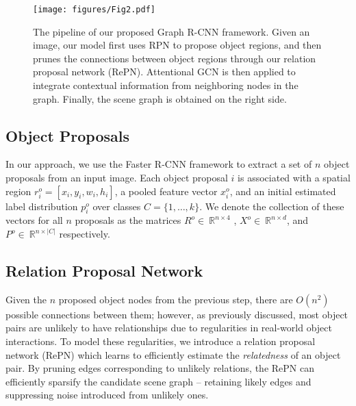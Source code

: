 \begin{figure}[t]
\centering
\texttt{[image: figures/Fig2.pdf]}
\caption{The pipeline of our proposed Graph R-CNN framework. Given an image, our model first uses RPN to propose object regions, and then prunes the connections between object regions through our relation proposal network (RePN). Attentional GCN is then applied to integrate contextual information from neighboring nodes in the graph. Finally, the scene graph is obtained on the right side.}
\label{fig:framework}
\end{figure}

\subsection{Object Proposals}
\label{sec:rpn}
In our approach, we use the Faster R-CNN \cite{ren2015faster} framework to extract a set of $n$ object proposals from an input image. Each object proposal $i$ is associated with a spatial region $r^o_i =[x_i,y_i,w_i,h_i]$, a pooled feature vector $x^o_i$, and an initial estimated label distribution $p^o_i$ over classes $C{=}\{1,\dots,k\}$. We denote the collection of these vectors for all $n$ proposals as the matrices $R^o {\in}~\mathbb{R}^{n \times 4}$ , $X^o {\in}~ \mathbb{R}^{n \times d}$, and $P^o{\in}~\mathbb{R}^{n \times |C|}$ respectively.

\subsection{Relation Proposal Network}
\label{sec:repn}

Given the $n$ proposed object nodes from the previous step, there are $O(n^2)$ possible connections between them; however, as previously discussed, most object pairs are unlikely to have relationships due to regularities in real-world object interactions. To model these regularities, we introduce a relation proposal network (RePN) which learns to  efficiently estimate the \emph{relatedness} of an object pair.  By pruning edges corresponding to unlikely relations, the RePN can efficiently sparsify the candidate scene graph -- retaining likely edges and suppressing noise introduced from unlikely ones.

